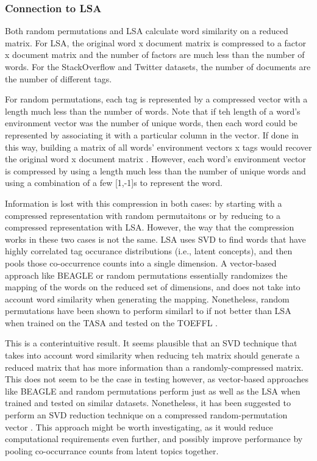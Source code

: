 \documentclass[man,floatsintext]{apa6}
\begin{document}
\subsubsection{Connection to LSA}

Both random permutations and LSA calculate word similarity on a reduced matrix.
For LSA, the original word x document matrix is compressed to a factor x document matrix and the number of factors are much less than the number of words.
For the StackOverflow and Twitter datasets, the number of documents are the number of different tags.

For random permutations, each tag is represented by a compressed vector with a length much less than the number of words.
Note that if teh length of a word's environment vector was the number of unique words, then each word could be represented by associating it with a particular column in the vector.
If done in this way, building a matrix of all words' environment vectors x tags would recover the original word x document matrix \parencite{Kanerva2000}.
However, each word's environment vector is compressed by using a length much less than the number of unique words and using a combination of a few [1,-1]s to represent the word.

Information is lost with this compression in both cases: by starting with a compressed representation with random permutaitons or by reducing to a compressed representation with LSA.
However, the way that the compression works in these two cases is not the same.
LSA uses SVD to find words that have highly correlated tag occurance distributions (i.e., latent concepts), and then pools those co-occurrence counts into a single dimension.
A vector-based approach like BEAGLE or random permutations essentially randomizes the mapping of the words on the reduced set of dimensions, and does not take into account word similarity when generating the mapping.
Nonetheless, random permutations have been shown to perform similarl to if not better than LSA when trained on the TASA and tested on the TOEFFL \parencites{Sahlgren2008,Jones2007}.

This is a conterintuitive result.
It seems plausible that an SVD technique that takes into account word similarity when reducing teh matrix should generate a reduced matrix that has more information than a randomly-compressed matrix.
This does not seem to be the case in testing however, as vector-based approaches like BEAGLE and random permutations perform just as well as the LSA when trained and tested on similar datasets.
Nonetheless, it has been suggested to perform an SVD reduction technique on a compressed random-permutation vector \parencite{Kanerva2000}.
This approach might be worth investigating, as it would reduce computational requirements even further, and possibly improve performance by pooling co-occurrance counts from latent topics together.
\end{document}
